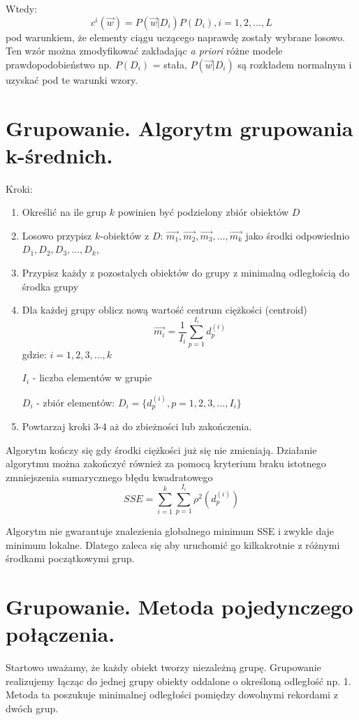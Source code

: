 \documentclass[a4paper,10pt]{article}
\begin{document}
Wtedy:
\begin{equation}
c^i(\overrightarrow{w})=P(\overrightarrow{w}|D_i)P(D_i), i=1,2,\ldots,L
\end{equation}
pod warunkiem, że elementy ciągu uczącego naprawdę zostały wybrane losowo.
Ten wzór można zmodyfikować zakładając \textit{a priori} różne modele prawdopodobieństwo np. $P(D_i)$ = stała, $P(\overrightarrow{w}|D_i)$ są rozkładem normalnym
i uzyskać pod te warunki wzory.

\section{Grupowanie. Algorytm grupowania k-średnich.}
Kroki:
\begin{enumerate}
\item Określić na ile grup $k$ powinien być podzielony zbiór obiektów $D$
\item Losowo przypisz $k$-obiektów z $D$: $\overrightarrow{m_1}, \overrightarrow{m_2}, \overrightarrow{m_3}, \ldots, \overrightarrow{m_k}$ jako środki odpowiednio $D_1, D_2, D_3, \ldots, D_k$,
\item Przypisz każdy z pozostalych obiektów do grupy z minimalną odległością do środka grupy
\item Dla każdej grupy oblicz nową wartość centrum ciężkości (centroid)
\begin{equation}
\overrightarrow{m_i} = \frac{1}{I_i} \sum_{p=1}^{I_i} d_p^{(i)}
\end{equation}
gdzie:
$i=1,2,3,\ldots,k$

$I_i$ - liczba elementów w grupie

$D_i$ - zbiór elementów: $D_i = \{d_p^{(i)}, p = 1,2,3,\ldots,I_i\}$
\item Powtarzaj kroki 3-4 aż do zbieżności lub zakończenia.
\end{enumerate}

Algorytm kończy się gdy środki ciężkości już się nie zmieniają.
Działanie algorytmu można zakończyć również za pomocą kryterium braku istotnego zmniejszenia sumarycznego błędu kwadratowego 
\begin{equation}
SSE = \sum_{i=1}^{k} \sum_{p=1}^{I_i}\rho^2 (d_p^{(i)})
\end{equation}

Algorytm nie gwarantuje znalezienia globalnego minimum SSE i zwykle daje minimum lokalne. Dlatego zaleca się aby uruchomić go kilkakrotnie z różnymi środkami początkowymi grup.

\section{Grupowanie. Metoda pojedynczego połączenia.}
Startowo uważamy, że każdy obiekt tworzy niezależną grupę.
Grupowanie realizujemy łącząc do jednej grupy obiekty oddalone o określoną odległość np. 1.
Metoda ta poszukuje minimalnej odległości pomiędzy dowolnymi rekordami z dwóch grup.
\end{document}
